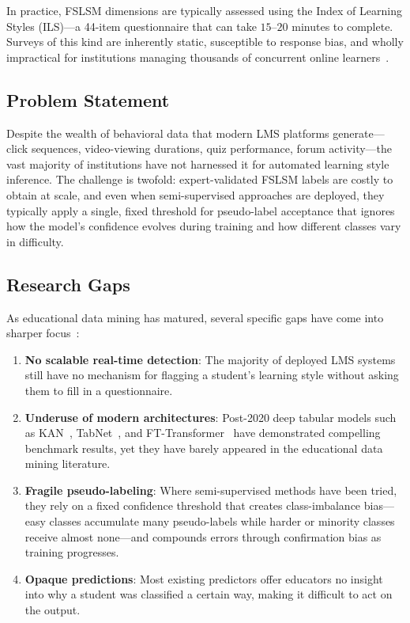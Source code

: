 \documentclass[journal, onecolumn]{IEEEtran}
\begin{document}
In practice, FSLSM dimensions are typically assessed using the Index of Learning Styles (ILS)---a 44-item questionnaire that can take $15$--$20$ minutes to complete. Surveys of this kind are inherently static, susceptible to response bias, and wholly impractical for institutions managing thousands of concurrent online learners~\cite{graf2007providing}.

\subsection{Problem Statement}

Despite the wealth of behavioral data that modern LMS platforms generate---click sequences, video-viewing durations, quiz performance, forum activity---the vast majority of institutions have not harnessed it for automated learning style inference. The challenge is twofold: expert-validated FSLSM labels are costly to obtain at scale, and even when semi-supervised approaches are deployed, they typically apply a single, fixed threshold for pseudo-label acceptance that ignores how the model's confidence evolves during training and how different classes vary in difficulty.

\subsection{Research Gaps}

As educational data mining has matured, several specific gaps have come into sharper focus~\cite{ieee_tlt_2024}:

\begin{enumerate}
    \item \textbf{No scalable real-time detection}: The majority of deployed LMS systems still have no mechanism for flagging a student's learning style without asking them to fill in a questionnaire.
    \item \textbf{Underuse of modern architectures}: Post-2020 deep tabular models such as KAN~\cite{liu2024kan}, TabNet~\cite{arik2021tabnet}, and FT-Transformer~\cite{gorishniy2021revisiting} have demonstrated compelling benchmark results, yet they have barely appeared in the educational data mining literature.
    \item \textbf{Fragile pseudo-labeling}: Where semi-supervised methods have been tried, they rely on a fixed confidence threshold that creates class-imbalance bias---easy classes accumulate many pseudo-labels while harder or minority classes receive almost none---and compounds errors through confirmation bias as training progresses.
    \item \textbf{Opaque predictions}: Most existing predictors offer educators no insight into why a student was classified a certain way, making it difficult to act on the output.
\end{enumerate}
\end{document}
